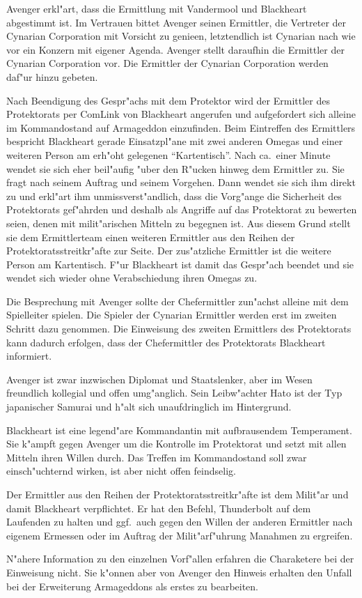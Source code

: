 Avenger erkl"art, dass die Ermittlung mit Vandermool und Blackheart abgestimmt ist. Im Vertrauen bittet Avenger seinen Ermittler, die Vertreter der Cynarian Corporation mit Vorsicht zu genie\3en, letztendlich ist Cynarian nach wie vor ein Konzern mit eigener Agenda. Avenger stellt daraufhin die Ermittler der Cynarian Corporation vor. Die Ermittler der Cynarian Corporation werden daf"ur hinzu gebeten.

Nach Beendigung des Gespr"achs mit dem Protektor wird der Ermittler des Protektorats per ComLink von Blackheart angerufen und aufgefordert sich alleine im Kommandostand auf Armageddon einzufinden. Beim Eintreffen des Ermittlers bespricht Blackheart gerade Einsatzpl"ane mit zwei anderen Omegas und einer weiteren Person am erh"oht gelegenen "`Kartentisch"'. Nach ca.~einer Minute  wendet sie sich eher beil"aufig "uber den R"ucken hinweg dem Ermittler zu. Sie fragt nach seinem Auftrag und seinem Vorgehen. Dann wendet sie sich ihm direkt zu und erkl"art ihm unmissverst"andlich, dass die Vorg"ange die Sicherheit des Protektorats gef"ahrden und deshalb als Angriffe auf das Protektorat zu bewerten seien, denen mit milit"arischen Mitteln zu begegnen ist. Aus diesem Grund stellt sie dem Ermittlerteam einen weiteren Ermittler aus den Reihen der Protektoratsstreitkr"afte zur Seite. Der zus"atzliche Ermittler ist die weitere Person am Kartentisch. F"ur Blackheart ist damit das Gespr"ach beendet und sie wendet sich wieder ohne Verabschiedung ihren Omegas zu.

\begin{remarks}
	Die Besprechung mit Avenger sollte der Chefermittler zun"achst alleine mit dem Spielleiter spielen. Die Spieler der Cynarian Ermittler werden erst im zweiten Schritt dazu genommen. Die Einweisung des zweiten Ermittlers des Protektorats kann dadurch erfolgen, dass der Chefermittler des Protektorats Blackheart informiert.
	
	Avenger ist zwar inzwischen Diplomat und Staatslenker, aber im Wesen freundlich kollegial und offen umg"anglich. Sein Leibw"achter Hato ist der Typ japanischer Samurai und h"alt sich unaufdringlich im Hintergrund.
	
	Blackheart ist eine legend"are Kommandantin mit aufbrausendem Temperament. Sie k"ampft gegen Avenger um die Kontrolle im Protektorat und setzt mit allen Mitteln ihren Willen durch. Das Treffen im Kommandostand soll zwar einsch"uchternd wirken, ist aber nicht offen feindselig.
	
	Der Ermittler aus den Reihen der Protektoratsstreitkr"afte ist dem Milit"ar und damit Blackheart verpflichtet. Er hat den Befehl, Thunderbolt auf dem Laufenden zu halten und ggf.~auch gegen den Willen der anderen Ermittler nach eigenem Ermessen oder im Auftrag der Milit"arf"uhrung Ma\3nahmen zu ergreifen.
	
	N"ahere Information zu den einzelnen Vorf"allen erfahren die Charaketere bei der Einweisung nicht. Sie k"onnen aber von Avenger den Hinweis erhalten den Unfall bei der Erweiterung Armageddons als erstes zu bearbeiten.
\end{remarks}


